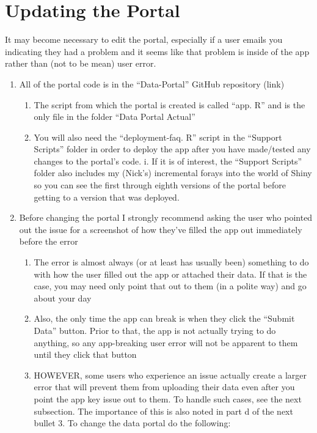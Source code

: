 \documentclass[
  letterpaper,
  oneside,
  open=any]{scrbook}
\begin{document}
\section{Updating the Portal}\label{updating-the-portal}

It may become necessary to edit the portal, especially if a user emails
you indicating they had a problem and it seems like that problem is
inside of the app rather than (not to be mean) user error.

\begin{enumerate}
\def\labelenumi{\arabic{enumi}.}
\item
  All of the portal code is in the ``Data-Portal'' GitHub repository
  (link)

  \begin{enumerate}
  \def\labelenumii{\alph{enumii}.}
  \item
    The script from which the portal is created is called ``app. R'' and
    is the only file in the folder ``Data Portal Actual''
  \item
    You will also need the ``deployment-faq. R'' script in the ``Support
    Scripts'' folder in order to deploy the app after you have
    made/tested any changes to the portal's code. i. If it is of
    interest, the ``Support Scripts'' folder also includes my (Nick's)
    incremental forays into the world of Shiny so you can see the first
    through eighth versions of the portal before getting to a version
    that was deployed.
  \end{enumerate}
\item
  Before changing the portal I strongly recommend asking the user who
  pointed out the issue for a screenshot of how they've filled the app
  out immediately before the error

  \begin{enumerate}
  \def\labelenumii{\alph{enumii}.}
  \item
    The error is almost always (or at least has usually been) something
    to do with how the user filled out the app or attached their data.
    If that is the case, you may need only point that out to them (in a
    polite way) and go about your day
  \item
    Also, the only time the app can break is when they click the
    ``Submit Data'' button. Prior to that, the app is not actually
    trying to do anything, so any app-breaking user error will not be
    apparent to them until they click that button
  \item
    HOWEVER, some users who experience an issue actually create a larger
    error that will prevent them from uploading their data even after
    you point the app key issue out to them. To handle such cases, see
    the next subsection. The importance of this is also noted in part d
    of the next bullet 3. To change the data portal do the following:
  \end{enumerate}


\end{enumerate}
\end{document}
